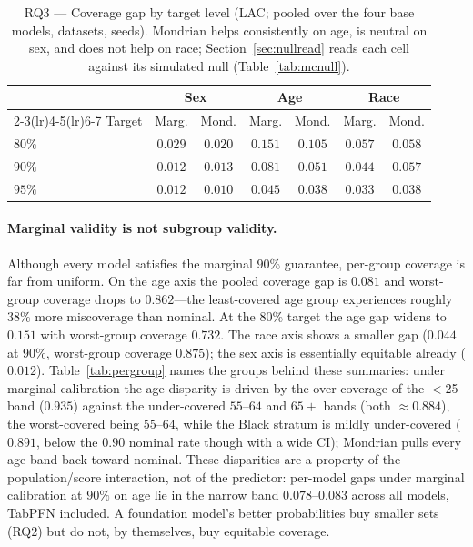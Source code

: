 \documentclass[review,12pt]{elsarticle}
\begin{document}
\begin{table}[t]
\centering
\caption{RQ3 --- Coverage gap by target level (LAC; pooled over the four base models, datasets, seeds). Mondrian helps consistently on age, is neutral on sex, and does not help on race; Section~\ref{sec:nullread} reads each cell against its simulated null (Table~\ref{tab:mcnull}).}
\label{tab:rq3targets}
\small
\begin{tabular}{lcccccc}
\toprule
 & \multicolumn{2}{c}{Sex} & \multicolumn{2}{c}{Age} & \multicolumn{2}{c}{Race} \\
\cmidrule(lr){2-3}\cmidrule(lr){4-5}\cmidrule(lr){6-7}
Target & Marg. & Mond. & Marg. & Mond. & Marg. & Mond. \\
\midrule
$80\%$ & $0.029$ & $0.020$ & $0.151$ & $0.105$ & $0.057$ & $0.058$ \\
$90\%$ & $0.012$ & $0.013$ & $0.081$ & $0.051$ & $0.044$ & $0.057$ \\
$95\%$ & $0.012$ & $0.010$ & $0.045$ & $0.038$ & $0.033$ & $0.038$ \\
\bottomrule
\end{tabular}
\end{table}

\paragraph{Marginal validity is not subgroup validity.}
Although every model satisfies the marginal $90\%$ guarantee, per-group coverage is far from uniform. On the age axis the pooled coverage gap is $0.081$ and worst-group coverage drops to $0.862$---the least-covered age group experiences roughly $38\%$ more miscoverage than nominal. At the $80\%$ target the age gap widens to $0.151$ with worst-group coverage $0.732$. The race axis shows a smaller gap ($0.044$ at $90\%$, worst-group coverage $0.875$); the sex axis is essentially equitable already ($0.012$). Table~\ref{tab:pergroup} names the groups behind these summaries: under marginal calibration the age disparity is driven by the over-coverage of the $<$25 band ($0.935$) against the under-covered $55$--$64$ and $65+$ bands (both $\approx\!0.884$), the worst-covered being $55$--$64$, while the Black stratum is mildly under-covered ($0.891$, below the $0.90$ nominal rate though with a wide CI); Mondrian pulls every age band back toward nominal. These disparities are a property of the population/score interaction, not of the predictor: per-model gaps under marginal calibration at $90\%$ on age lie in the narrow band $0.078$--$0.083$ across all models, TabPFN included. A foundation model's better probabilities buy smaller sets (RQ2) but do not, by themselves, buy equitable coverage.
\end{document}
